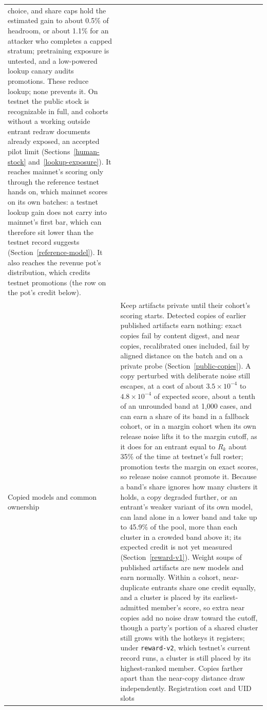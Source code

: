 \begin{longtable}{@{}>{\raggedright\arraybackslash}p{}>{\raggedright\arraybackslash}p{}@{}}
choice, and share caps hold the estimated gain to about 0.5\% of headroom, or
about 1.1\% for an attacker who completes a capped stratum; pretraining exposure
is untested, and a low-powered lookup canary audits promotions. These reduce
lookup; none prevents it. On testnet the public stock is recognizable in full,
and cohorts without a working outside entrant redraw documents already exposed,
an accepted pilot limit (Sections~\ref{human-stock} and~\ref{lookup-exposure}).
It reaches mainnet's scoring only through the reference testnet hands on, which mainnet
scores on its own batches: a testnet lookup gain does not carry into mainnet's
first bar, which can therefore sit lower than the testnet record suggests
(Section~\ref{reference-model}). It also reaches the revenue pot's
distribution, which credits testnet promotions (the row on the pot's credit
below). \\
Copied models and common ownership & Keep artifacts private until their
cohort's scoring starts. Detected copies of earlier published artifacts earn nothing: exact copies fail by content
digest, and near copies, recalibrated ones included, fail by aligned distance on
the batch and on a private probe (Section~\ref{public-copies}). A copy perturbed
with deliberate noise still escapes, at a cost of about \(3.5\times10^{-4}\) to
\(4.8\times10^{-4}\) of expected score, about a tenth of an unrounded band at
1,000 cases, and can earn a share of its band in a fallback cohort, or in a
margin cohort when its own release noise lifts it to the margin cutoff, as it
does for an entrant equal to \(R_k\) about 35\% of the time at testnet's full
roster; promotion tests the margin on exact scores, so release noise cannot
promote it. Because a band's share
ignores how many clusters it holds, a copy degraded further, or an entrant's
weaker variant of its own model, can land alone in a lower band and take up to
45.9\% of the pool, more than each cluster in a crowded band above it; its
expected credit is not yet measured (Section~\ref{reward-v1}).
Weight soups of published artifacts are new models and earn normally. Within a
cohort, near-duplicate entrants share one credit equally, and a cluster is
placed by its earliest-admitted member's score, so extra near copies add no
noise draw toward the cutoff, though a party's portion of a shared cluster
still grows with the hotkeys it registers; under \texttt{reward-v2}, which
testnet's current record runs, a cluster is still placed by its
highest-ranked member. Copies farther apart than
the near-copy distance draw independently. Registration cost and UID slots

\end{longtable}
